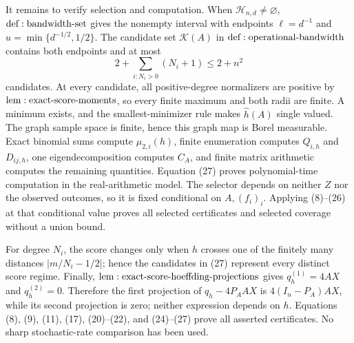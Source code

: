 It remains to verify selection and computation.  When \(\mathcal H_{n,d}\ne\varnothing\), \({\rm def:bandwidth\text{-}set}\) gives the nonempty interval with endpoints \(\ell=d^{-1}\) and \(u=\min\{d^{-1/2},1/2\}\).  The candidate set \(\mathcal K(A)\) in \({\rm def:operational\text{-}bandwidth}\) contains both endpoints and at most
\[
 2+\sum_{i:N_i>0}(N_i+1)\leq2+n^2
\tag{27}
\]
candidates.  At every candidate, all positive-degree normalizers are positive by \({\rm lem:exact\text{-}score\text{-}moments}\), so every finite maximum and both radii are finite.  A minimum exists, and the smallest-minimizer rule makes \(\widehat h(A)\) single valued.  The graph sample space is finite, hence this graph map is Borel measurable.  Exact binomial sums compute \(\mu_{2,i}(h)\), finite enumeration computes \(Q_{i,h}\) and \(D_{ij,h}\), one eigendecomposition computes \(C_A\), and finite matrix arithmetic computes the remaining quantities.  Equation (27) proves polynomial-time computation in the real-arithmetic model.  The selector depends on neither \(Z\) nor the observed outcomes, so it is fixed conditional on \(A,(f_i)_i\).  Applying (8)--(26) at that conditional value proves all selected certificates and selected coverage without a union bound.

For degree \(N_i\), the score changes only when \(h\) crosses one of the finitely many distances \(|m/N_i-1/2|\); hence the candidates in (27) represent every distinct score regime.  Finally, \({\rm lem:exact\text{-}score\text{-}hoeffding\text{-}projections}\) gives \(q_h^{(1)}=4AX\) and \(q_h^{(2)}=0\).  Therefore the first projection of \(q_h-4P_AAX\) is \(4(I_n-P_A)AX\), while its second projection is zero; neither expression depends on \(h\).  Equations (8), (9), (11), (17), (20)--(22), and (24)--(27) prove all asserted certificates.  No sharp stochastic-rate comparison has been used.